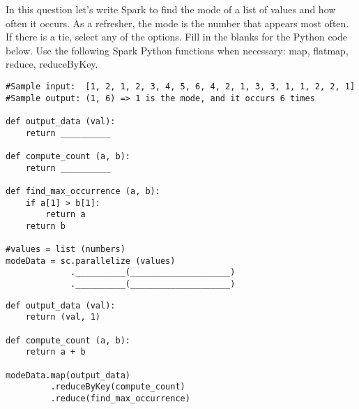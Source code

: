 \begin{blocksection}
\question
In this question let’s write Spark to find the mode of a list of values and how often it occurs. As a refresher, the mode is the number that appears most often. If there is a tie, select any of the options. Fill in the blanks for the Python code below.​ Use the following Spark Python functions when necessary: map​, flatmap​, reduce​, reduceByKey​. 

\begin{verbatim}
#Sample input:  [1​, 2, 1​, 2, 3, 4, 5, 6, 4, 2, 1,​ 3, 3, 1​, 1​, 2, 2, 1​]
#Sample output: (1, 6) => 1 is the mode, and it occurs 6 times

def output_data (val):
    return __________

def compute_count (a, b):
    return __________

def find_max_occurrence (a, b):
    if a[1] > b[1]: 
        return a 
    return b

#values = list (numbers) 
modeData = sc.parallelize (values)
			 .__________(____________________)
			 .__________(____________________)
\end{verbatim}

\begin{solution}
\begin{verbatim}
def output_data (val):
    return (val, 1)

def compute_count (a, b):
    return a + b

modeData.map(output_data)
         .reduceByKey(compute_count)
         .reduce(find_max_occurrence)
\end{verbatim}

\end{solution}

\end{blocksection}